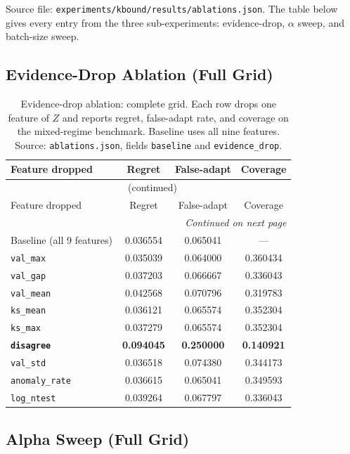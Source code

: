 Source file: \texttt{experiments/kbound/results/ablations.json}.  The table below
gives every entry from the three sub-experiments: evidence-drop, $\alpha$ sweep, and
batch-size sweep.

\subsection{Evidence-Drop Ablation (Full Grid)}

\begin{longtable}{lccc}
\caption{Evidence-drop ablation: complete grid.  Each row drops one feature of $Z$ and
  reports regret, false-adapt rate, and coverage on the mixed-regime benchmark.
  Baseline uses all nine features.  Source: \texttt{ablations.json},
  fields \texttt{baseline} and \texttt{evidence\_drop}.}\label{tab:full-abl-drop} \\
\toprule
Feature dropped & Regret & False-adapt & Coverage \\
\midrule
\endfirsthead
\multicolumn{4}{c}{\tablename\ \thetable{} (continued)}\\
\toprule
Feature dropped & Regret & False-adapt & Coverage \\
\midrule
\endhead
\midrule
\multicolumn{4}{r}{\textit{Continued on next page}}\\
\endfoot
\bottomrule
\endlastfoot
Baseline (all 9 features) & 0.036554 & 0.065041 & --- \\
\midrule
\texttt{val\_max}      & 0.035039 & 0.064000 & 0.360434 \\
\texttt{val\_gap}      & 0.037203 & 0.066667 & 0.336043 \\
\texttt{val\_mean}     & 0.042568 & 0.070796 & 0.319783 \\
\texttt{ks\_mean}      & 0.036121 & 0.065574 & 0.352304 \\
\texttt{ks\_max}       & 0.037279 & 0.065574 & 0.352304 \\
\textbf{\texttt{disagree}} & \textbf{0.094045} & \textbf{0.250000} & \textbf{0.140921} \\
\texttt{val\_std}      & 0.036518 & 0.074380 & 0.344173 \\
\texttt{anomaly\_rate} & 0.036615 & 0.065041 & 0.349593 \\
\texttt{log\_ntest}    & 0.039264 & 0.067797 & 0.336043 \\
\end{longtable}

\subsection{Alpha Sweep (Full Grid)}

